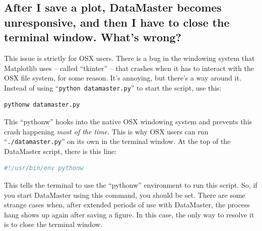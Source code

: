 \documentclass[12pt]{article}
\begin{document}
{\subsection*{After I save a plot, DataMaster becomes unresponsive, and then I have to close the terminal window. What's wrong?}

This issue is strictly for OSX users. There is a bug in the windowing system that Matplotlib uses -- called ``tkinter'' -- that crashes when it has to interact with the OSX file system, for some reason. It's annoying, but there's a way around it. Instead of using ``\texttt{python datamaster.py}'' to start the script, use this:
\begin{framed}
  \begin{lstlisting}[language=sh]
    pythonw datamaster.py
  \end{lstlisting}
\end{framed}
This ``pythonw'' hooks into the native OSX windowing system and prevents this crash happening \textit{most of the time}. This is why OSX users can run ``\texttt{./datamaster.py}'' on its own in the terminal window. At the top of the DataMaster script, there is this line:
\begin{framed}
  \begin{lstlisting}[language=sh]
    #!/usr/bin/env pythonw
  \end{lstlisting}
\end{framed}
This tells the terminal to use the ``pythonw'' environment to run this script. So, if you start DataMaster using this command, you should be set. There are some strange cases when, after extended periods of use with DataMaster, the process hang shows up again after saving a figure. In this case, the only way to resolve it is to close the terminal window.

\printbibliography[title={References}]

}
\end{document}
